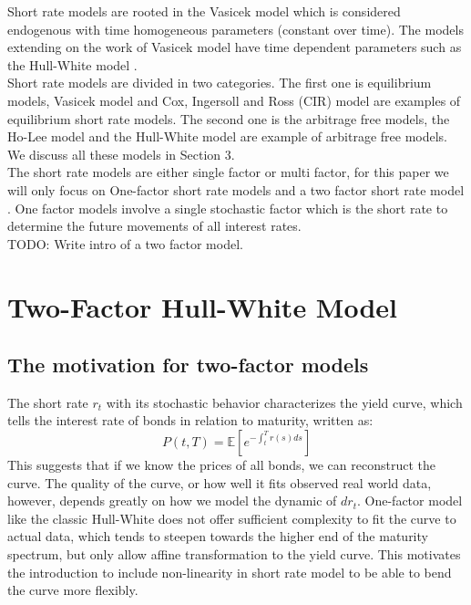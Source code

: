 \documentclass{article}
\begin{document}
Short rate models are rooted in the Vasicek model \cite{BN1} which is considered endogenous with time homogeneous parameters (constant over time).  The models extending on the work of Vasicek model have time dependent parameters such as the Hull-White model \cite{HW1}. \\

Short rate models are divided in two categories.  The first one is equilibrium models, Vasicek model and Cox, Ingersoll and Ross (CIR) model are examples of equilibrium short rate models.  The second one is the arbitrage free models, the Ho-Lee model and the Hull-White model are example of arbitrage free models.  We discuss all these models in Section 3. \\ 

The short rate models are either single factor or multi factor, for this paper we will only focus on One-factor short rate models and a two factor short rate model \cite{BA1}.  One factor  models involve a single stochastic factor which is the short rate to determine the future movements of all interest rates.  \\

TODO: Write intro of a two factor model.


\section{Two-Factor Hull-White Model 
}
\subsection{The motivation for two-factor models
}
The short rate $r_t$ with its stochastic behavior characterizes the yield curve, which tells the interest rate of bonds in relation to maturity, written as:
\[
P(t,T) = \mathbb{E}\left[e^{-\int_{t}^{T}r(s)ds}\right]
\]
This suggests that if we know the prices of all bonds, we can reconstruct the curve. The quality of the curve, or how well it fits observed real world data, however, depends greatly on how we model the dynamic of $dr_t$. One-factor model like the classic Hull-White does not offer sufficient complexity to fit the curve to actual data, which tends to steepen towards the higher end of the maturity spectrum, but only allow affine transformation to the yield curve. This motivates the introduction to include non-linearity in short rate model to be able to bend the curve more flexibly.
\end{document}
